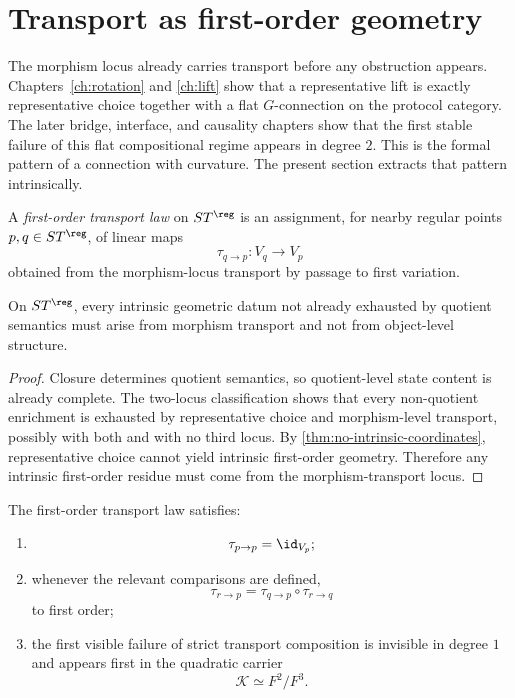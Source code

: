 \section{Transport as first-order geometry}
\label{sec:transport-first-order}
The morphism locus already carries transport before any obstruction
appears.  Chapters~\ref{ch:rotation} and \ref{ch:lift} show that a
representative lift is exactly representative choice together with a
flat \(G\)-connection on the protocol category.  The later bridge,
interface, and causality chapters show that the first stable failure of
this flat compositional regime appears in degree \(2\).
This is the formal pattern of a connection with curvature.  The present
section extracts that pattern intrinsically.
\begin{definition}
	A \emph{first-order transport law} on \(ST^{\reg}\) is an assignment,
	for nearby regular points \(p,q\in ST^{\reg}\), of linear maps
	\[
		\tau_{q\to p}:V_q\to V_p
	\]
	obtained from the morphism-locus transport by passage to first
	variation.
\end{definition}
\begin{proposition}
	\label{prop:connection-transport-unique}
	On \(ST^{\reg}\), every intrinsic geometric datum not already exhausted
	by quotient semantics must arise from morphism transport and not from
	object-level structure.
\end{proposition}
\begin{proof}
	Closure determines quotient semantics, so quotient-level state
	content is already complete.
	The two-locus classification shows that every non-quotient
	enrichment is exhausted by representative choice and morphism-level
	transport, possibly with both and with no third locus.
	By \cref{thm:no-intrinsic-coordinates}, representative choice cannot
	yield intrinsic first-order geometry.
	Therefore any intrinsic first-order residue must come from the
	morphism-transport locus.
\end{proof}
\begin{proposition}
	\label{prop:connection-functoriality}
	The first-order transport law satisfies:
	\begin{enumerate}[label=\textup{(\roman*)}]
		\item
		      \[
			      \tau_{p\to p}=\id_{V_p};
		      \]
		\item
		      whenever the relevant comparisons are defined,
		      \[
			      \tau_{r\to p}
			      =
			      \tau_{q\to p}\circ\tau_{r\to q}
		      \]
		      to first order;
		\item
		      the first visible failure of strict transport composition is invisible
		      in degree \(1\) and appears first in the quadratic carrier
		      \[
			      \mathcal K\simeq F^2/F^3.
		      \]
	\end{enumerate}
\end{proposition}
